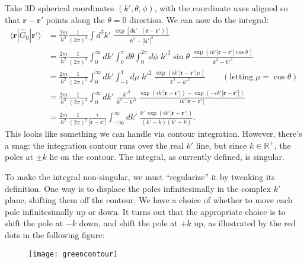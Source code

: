 \documentclass[pra,12pt]{revtex4}
\begin{document}
Take 3D spherical coordinates $(k',\theta,\phi)$, with the coordinate
axes aligned so that $\mathbf{r}-\mathbf{r}'$ points along the
$\theta=0$ direction.  We can now do the integral:
\begin{align}
  \langle\mathbf{r}|\hat{G}_0|\mathbf{r}'\rangle &= \frac{2m}{\hbar^2} \frac{1}{(2\pi)^3} \int d^3k' \; \frac{\exp\left[i\mathbf{k}'\cdot (\mathbf{r}-\mathbf{r}')\right]}{k^2-|\mathbf{k}'|^2} \nonumber \\
  &= \frac{2m}{\hbar^2} \frac{1}{(2\pi)^3} \int_0^\infty dk' \int_0^\pi d\theta \int_{0}^{2\pi} d\phi \;{k'}^{2}\sin\theta\; \frac{\displaystyle \exp\left(ik'|\mathbf{r}-\mathbf{r}'|\cos\theta\right)}{k^2-{k'}^2} \nonumber \\
  &= \frac{2m}{\hbar^2} \frac{1}{(2\pi)^2} \int_0^\infty dk' \int_{-1}^1 d\mu \;{k'}^2\; \frac{\displaystyle \exp\left(ik'|\mathbf{r}-\mathbf{r}'|\mu\right)}{k^2-{k'}^2} \qquad(\text{letting}\;\mu = \cos\theta) \nonumber \\
  &= \frac{2m}{\hbar^2} \frac{1}{(2\pi)^2} \int_0^\infty dk' \; \frac{ {k'}^2}{k^2-{k'}^2}\, \frac{\displaystyle \exp\left(ik'|\mathbf{r}-\mathbf{r}'|\right) - \exp\left(-ik'|\mathbf{r}-\mathbf{r}'|\right)}{ik'|\mathbf{r}-\mathbf{r}'|} \nonumber\\
  &= \frac{2m}{\hbar^2} \frac{1}{(2\pi)^2} \frac{i}{|\mathbf{r}-\mathbf{r}'|} \int_{-\infty}^\infty dk' \; \frac{\displaystyle k'\, \exp\left(ik'|\mathbf{r}-\mathbf{r}'|\right)}{(k' - k)(k'+k)}.
  \label{rGrintegrand}
\end{align}
This looks like something we can handle via contour integration.
However, there's a snag: the integration contour runs over the real
$k'$ line, but since $k \in \mathbb{R}^+$, the poles at $\pm k$ lie on
the contour.  The integral, as currently defined, is singular.

To make the integral non-singular, we must ``regularize'' it by
tweaking its definition.  One way is to displace the poles
infinitesimally in the complex $k'$ plane, shifting them off the
contour.  We have a choice of whether to move each pole
infinitesimally up or down.  It turns out that the appropriate choice
is to shift the pole at $-k$ down, and shift the pole at $+k$ up, as
illustrated by the red dots in the following figure:

\begin{figure}[h!]
  \centering\texttt{[image: greencontour]}
\end{figure}
\end{document}
